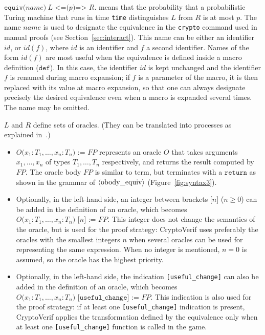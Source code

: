 \begin{itemize}
$\texttt{equiv(}\mathit{name}\texttt{)}\ L\texttt{ <=(}p\texttt{)=> }R\texttt{.}$ means that the
probability that a probabilistic Turing machine that runs in time
{\tt time} distinguishes $L$ from $R$ is at most $p$. The name $\mathit{name}$
is used to designate the equivalence in the \texttt{crypto} command used in manual proofs (see Section~\ref{sec:interact}). This name can be either an identifier $\mathit{id}$, or $\mathit{id}(f)$, where $\mathit{id}$ is an identifier and $f$ a second identifier. Names of the form $\mathit{id}(f)$ are most useful when the equivalence is defined inside a macro definition ($\texttt{def}$). In this case, the identifier $\mathit{id}$ is kept unchanged and the identifier $f$ is renamed during macro expansion; if $f$ is a parameter of the macro, it is then replaced with its value at macro expansion, so that one can always designate precisely the desired equivalence even when a macro is expanded several times.
The name may be omitted.

$L$ and $R$ define sets of oracles. (They can be translated into
processes as explained in~\cite{BlanchetEPrint05}.)
\begin{itemize}

\item $O\texttt{(}x_1:T_1, \ldots, x_n:T_n\texttt{) := }\mathit{FP}$ represents
an oracle $O$ that takes arguments $x_1, \ldots, x_n$ of types
$T_1, \ldots, T_n$ respectively, and returns the result computed by $\mathit{FP}$.
The oracle body $\mathit{FP}$ is similar to term, but terminates with
a $\texttt{return}$ as shown in the grammar of $\langle\textrm{obody\_equiv}\rangle$ 
(Figure~\ref{fig:syntax3}).

\item Optionally, in the left-hand side,
an integer between brackets $\texttt{[}n\texttt{]}$ ($n \geq 0$)
can be added in the definition of an oracle, which becomes 
$O\texttt{(}x_1:T_1, \ldots, x_n:T_n\texttt{) [}n\texttt{] := }\mathit{FP}$.
This integer does not change the semantics of the oracle, but is
used for the proof strategy: CryptoVerif uses preferably the oracles
with the smallest integers $n$ when several oracles can be used
for representing the same expression. When no integer is mentioned,
$n = 0$ is assumed, so the oracle has the highest priority.

\item Optionally, in the left-hand side, 
the indication \texttt{[useful\_change]} can also
be added in the definition of an oracle, which becomes 
$O\texttt{(}x_1:T_1, \ldots, x_n:T_n\texttt{) [useful\_change] := }\mathit{FP}$.
This indication is also used for the proof strategy: 
if at least one \texttt{[useful\_change]} indication is present,
CryptoVerif applies the transformation defined by the equivalence
only when at least one \texttt{[useful\_change]} function is called in the game.


\end{itemize}
\end{itemize}
